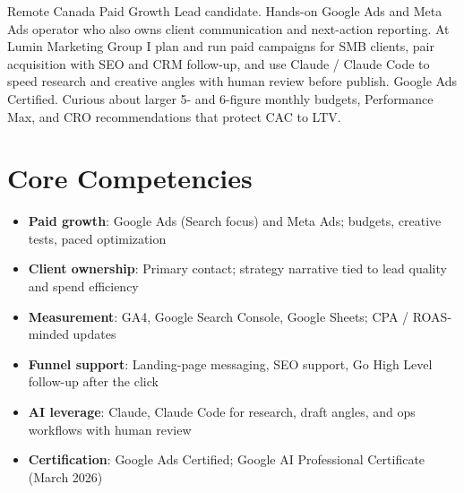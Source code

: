 \documentclass[11pt,a4paper,sans]{moderncv}
\begin{document}
\makecvtitle

\vspace{6pt}
\small{Remote Canada Paid Growth Lead candidate. Hands-on Google Ads and Meta Ads operator who also owns client communication and next-action reporting. At Lumin Marketing Group I plan and run paid campaigns for SMB clients, pair acquisition with SEO and CRM follow-up, and use Claude / Claude Code to speed research and creative angles with human review before publish. Google Ads Certified. Curious about larger 5- and 6-figure monthly budgets, Performance Max, and CRO recommendations that protect CAC to LTV.}

\section{Core Competencies}
\vspace{1pt}
\begin{itemize}
\item \textbf{Paid growth}: Google Ads (Search focus) and Meta Ads; budgets, creative tests, paced optimization
\item \textbf{Client ownership}: Primary contact; strategy narrative tied to lead quality and spend efficiency
\item \textbf{Measurement}: GA4, Google Search Console, Google Sheets; CPA / ROAS-minded updates
\item \textbf{Funnel support}: Landing-page messaging, SEO support, Go High Level follow-up after the click
\item \textbf{AI leverage}: Claude, Claude Code for research, draft angles, and ops workflows with human review
\item \textbf{Certification}: Google Ads Certified; Google AI Professional Certificate (March 2026)
\end{itemize}
\end{document}
